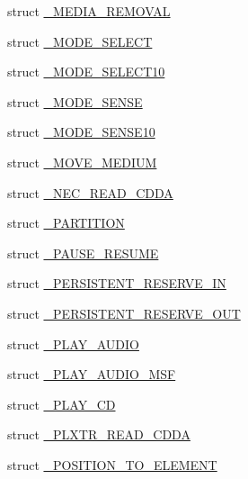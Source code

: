 \begin{DoxyCompactItemize}
\item 
struct \hyperlink{struct___c_d_b_1_1___m_e_d_i_a___r_e_m_o_v_a_l}{\+\_\+\+M\+E\+D\+I\+A\+\_\+\+R\+E\+M\+O\+V\+AL}
\item 
struct \hyperlink{struct___c_d_b_1_1___m_o_d_e___s_e_l_e_c_t}{\+\_\+\+M\+O\+D\+E\+\_\+\+S\+E\+L\+E\+CT}
\item 
struct \hyperlink{struct___c_d_b_1_1___m_o_d_e___s_e_l_e_c_t10}{\+\_\+\+M\+O\+D\+E\+\_\+\+S\+E\+L\+E\+C\+T10}
\item 
struct \hyperlink{struct___c_d_b_1_1___m_o_d_e___s_e_n_s_e}{\+\_\+\+M\+O\+D\+E\+\_\+\+S\+E\+N\+SE}
\item 
struct \hyperlink{struct___c_d_b_1_1___m_o_d_e___s_e_n_s_e10}{\+\_\+\+M\+O\+D\+E\+\_\+\+S\+E\+N\+S\+E10}
\item 
struct \hyperlink{struct___c_d_b_1_1___m_o_v_e___m_e_d_i_u_m}{\+\_\+\+M\+O\+V\+E\+\_\+\+M\+E\+D\+I\+UM}
\item 
struct \hyperlink{struct___c_d_b_1_1___n_e_c___r_e_a_d___c_d_d_a}{\+\_\+\+N\+E\+C\+\_\+\+R\+E\+A\+D\+\_\+\+C\+D\+DA}
\item 
struct \hyperlink{struct___c_d_b_1_1___p_a_r_t_i_t_i_o_n}{\+\_\+\+P\+A\+R\+T\+I\+T\+I\+ON}
\item 
struct \hyperlink{struct___c_d_b_1_1___p_a_u_s_e___r_e_s_u_m_e}{\+\_\+\+P\+A\+U\+S\+E\+\_\+\+R\+E\+S\+U\+ME}
\item 
struct \hyperlink{struct___c_d_b_1_1___p_e_r_s_i_s_t_e_n_t___r_e_s_e_r_v_e___i_n}{\+\_\+\+P\+E\+R\+S\+I\+S\+T\+E\+N\+T\+\_\+\+R\+E\+S\+E\+R\+V\+E\+\_\+\+IN}
\item 
struct \hyperlink{struct___c_d_b_1_1___p_e_r_s_i_s_t_e_n_t___r_e_s_e_r_v_e___o_u_t}{\+\_\+\+P\+E\+R\+S\+I\+S\+T\+E\+N\+T\+\_\+\+R\+E\+S\+E\+R\+V\+E\+\_\+\+O\+UT}
\item 
struct \hyperlink{struct___c_d_b_1_1___p_l_a_y___a_u_d_i_o}{\+\_\+\+P\+L\+A\+Y\+\_\+\+A\+U\+D\+IO}
\item 
struct \hyperlink{struct___c_d_b_1_1___p_l_a_y___a_u_d_i_o___m_s_f}{\+\_\+\+P\+L\+A\+Y\+\_\+\+A\+U\+D\+I\+O\+\_\+\+M\+SF}
\item 
struct \hyperlink{struct___c_d_b_1_1___p_l_a_y___c_d}{\+\_\+\+P\+L\+A\+Y\+\_\+\+CD}
\item 
struct \hyperlink{struct___c_d_b_1_1___p_l_x_t_r___r_e_a_d___c_d_d_a}{\+\_\+\+P\+L\+X\+T\+R\+\_\+\+R\+E\+A\+D\+\_\+\+C\+D\+DA}
\item 
struct \hyperlink{struct___c_d_b_1_1___p_o_s_i_t_i_o_n___t_o___e_l_e_m_e_n_t}{\+\_\+\+P\+O\+S\+I\+T\+I\+O\+N\+\_\+\+T\+O\+\_\+\+E\+L\+E\+M\+E\+NT}

\end{DoxyCompactItemize}
